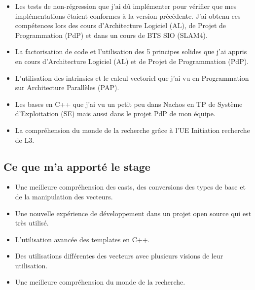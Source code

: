 \begin{itemize}
  \item Les tests de non-régression que j'ai dû implémenter pour vérifier que mes
  implémentations étaient conformes à la version précédente. J'ai obtenu ces compétences
  lors des cours d'Architecture Logiciel (AL), de Projet de Programmation (PdP) et dans
  un cours de BTS SIO (SLAM4).
  \item La factorisation de code et l'utilisation des 5 principes solides que j'ai
  appris en cours d'Architecture Logiciel (AL) et de Projet de Programmation (PdP).
  \item L'utilisation des intrinsics et le calcul vectoriel que j'ai vu en Programmation
  sur Architecture Parallèles (PAP).
  \item Les bases en C++ que j'ai vu un petit peu dans Nachos en TP de Système
  d'Exploitation (SE) mais aussi dans le projet PdP de mon équipe.
  \item La compréhension du monde de la recherche grâce à l'UE Initiation recherche de L3.
\end{itemize}

\subsection{Ce que m'a apporté le stage}

\begin{itemize}
  \item Une meilleure compréhension des casts, des conversions des types de base et de la
  manipulation des vecteurs.
  \item Une nouvelle expérience de développement dans un projet open source qui est très
  utilisé.
  \item L'utilisation avancée des templates en C++.
  \item Des utilisations différentes des vecteurs avec plusieurs visions de leur
  utilisation.
  \item Une meilleure compréhension du monde de la recherche.
\end{itemize}
